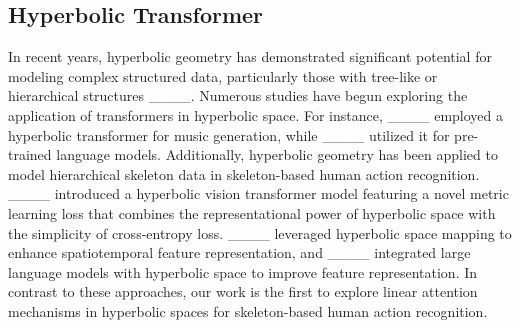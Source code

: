 \subsection{Hyperbolic Transformer}
In recent years, hyperbolic geometry has demonstrated significant potential for modeling complex structured data, particularly those with tree-like or hierarchical structures ____. Numerous studies have begun exploring the application of transformers in hyperbolic space. For instance,  ____ employed a hyperbolic transformer for music generation, while  ____ utilized it for pre-trained language models. Additionally, hyperbolic geometry has been applied to model hierarchical skeleton data in skeleton-based human action recognition.  ____ introduced a hyperbolic vision transformer model featuring a novel metric learning loss that combines the representational power of hyperbolic space with the simplicity of cross-entropy loss.  ____ leveraged hyperbolic space mapping to enhance spatiotemporal feature representation, and  ____ integrated large language models with hyperbolic space to improve feature representation. In contrast to these approaches, our work is the first to explore linear attention mechanisms in hyperbolic spaces for skeleton-based human action recognition.